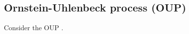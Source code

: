 \documentclass[../main.tex]{subfiles}
\begin{document}
\subsection{Ornstein-Uhlenbeck process (OUP)}\label{subsec2.1}
Consider the OUP \cite[Sub-section 4.4.4, p.106]{Gardiner03}.
\end{document}
